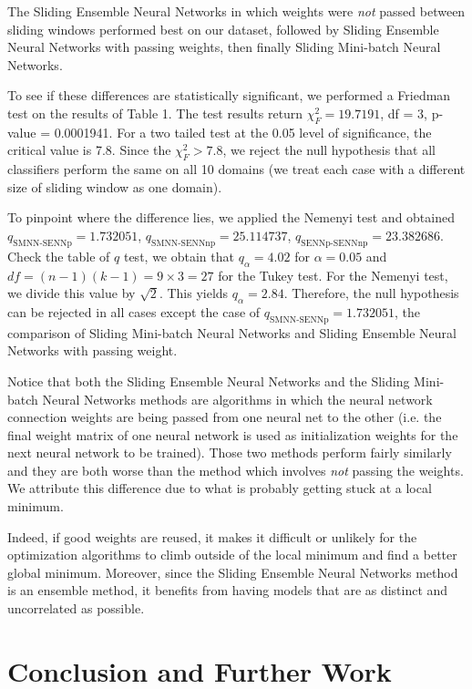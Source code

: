 \documentclass[conference]{IEEEtran}
\begin{document}
		The Sliding Ensemble Neural Networks in which weights were \emph{not} passed between sliding windows performed best on our dataset, followed by Sliding Ensemble Neural Networks with passing weights, then finally Sliding Mini-batch Neural Networks.
		
		To see if these differences are statistically significant, we performed a Friedman test on the results of Table 1. The test results return $\chi^2_F= 19.7191$, df = 3, p-value = 0.0001941. For a two tailed test at the 0.05 level of significance, the critical value is 7.8. Since the $\chi_F^2 >7.8$, we reject the null hypothesis that all classifiers perform the same on all 10 domains (we treat each case with a different size of sliding window as one domain).
		
		To pinpoint where the difference lies, we applied the Nemenyi test and obtained $q_{\text{SMNN-SENNp}}= 1.732051$,  $q_{\text{SMNN-SENNnp}}=25.114737$, $q_{\text{SENNp-SENNnp}}=23.382686$.
		Check the table of $q$ test, we obtain that $q_\alpha=4.02$ for $\alpha=0.05$ and $df = (n-1)(k-1) = 9 \times 3 = 27$ for the Tukey test. For the Nemenyi test, we divide this value by $\sqrt{2}$. This yields $q_\alpha = 2.84$. Therefore, the null hypothesis can be rejected in all cases except the case of $q_{\text{SMNN-SENNp}}= 1.732051$, the comparison of Sliding Mini-batch Neural Networks and Sliding Ensemble Neural Networks with passing weight.
		
		
		Notice that both the Sliding Ensemble Neural Networks and the Sliding Mini-batch Neural Networks methods are algorithms in which the neural network connection weights are being passed from one neural net to the other (i.e. the final weight matrix of one neural network is used as initialization weights for the next neural network to be trained). Those two methods perform fairly similarly and they are both worse than the method which involves \emph{not} passing the weights. We attribute this difference due to what is probably getting stuck at a local minimum.
		
		Indeed, if good weights are reused, it makes it  difficult or unlikely for the optimization algorithms to climb outside of the local minimum and find a better global minimum. Moreover, since the Sliding Ensemble Neural Networks method is an ensemble method, it benefits from having models that are as distinct and uncorrelated as possible.
		
		
		\section{Conclusion and Further Work}
		\label{sec:conclusion}
		
\end{document}
